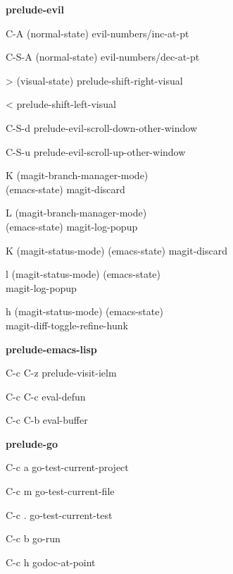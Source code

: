 \documentclass[10pt]{article}
\renewcommand\subsection[1]{\smallskip\par\textbf{\color{heading}#1}}
\renewcommand\subsection[1]{\smallskip\par\textbf{\color{heading}#1}}
\begin{document}
\begin{multicols}{4}
  \subsection{prelude-evil}
  \begin{keylist}
  \item[C-A] (normal-state) evil-numbers/inc-at-pt
  \item[C-S-A] (normal-state) evil-numbers/dec-at-pt
  \item[>] (visual-state) prelude-shift-right-visual
  \item[<] prelude-shift-left-visual
  \item[C-S-d] prelude-evil-scroll-down-other-window
  \item[C-S-u] prelude-evil-scroll-up-other-window
  \item[K] (magit-branch-manager-mode)\\
    (emacs-state) magit-discard
  \item[L] (magit-branch-manager-mode)\\
    (emacs-state) magit-log-popup
  \item[K] (magit-status-mode) (emacs-state) magit-discard
  \item[l] (magit-status-mode) (emacs-state)\\
    magit-log-popup
  \item[h] (magit-status-mode) (emacs-state)\\
    magit-diff-toggle-refine-hunk
  \end{keylist}

  \subsection{prelude-emacs-lisp}
  \begin{keylist}
  \item[C-c C-z] prelude-visit-ielm
  \item[C-c C-c] eval-defun
  \item[C-c C-b] eval-buffer
  \end{keylist}

  \subsection{prelude-go}
  \begin{keylist}
  \item[C-c a] go-test-current-project
  \item[C-c m] go-test-current-file
  \item[C-c .] go-test-current-test
  \item[C-c b] go-run
  \item[C-c h] godoc-at-point
  \end{keylist}


\end{multicols}
\end{document}
